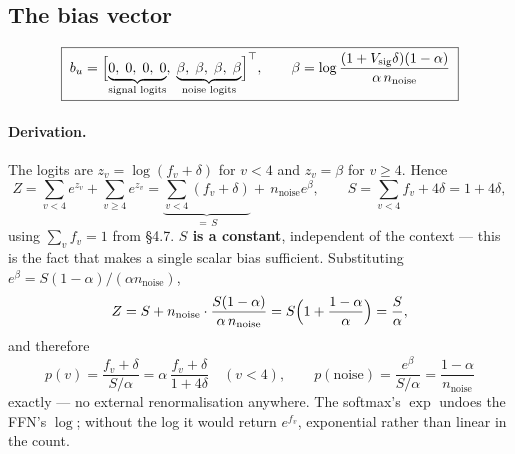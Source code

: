 \documentclass[11pt]{article}
\begin{document}
\subsection{The bias vector}
\begin{equation}
\boxed{\;
b_u=\Bigl[\underbrace{0,\;0,\;0,\;0}_{\text{signal logits}},\;
\underbrace{\beta,\;\beta,\;\beta,\;\beta}_{\text{noise logits}}\Bigr]^\top,
\qquad
\beta=\log\frac{(1+V_{\mathrm{sig}}\delta)(1-\alpha)}{\alpha\,n_{\mathrm{noise}}}\; }
\end{equation}

\paragraph{Derivation.} The logits are $z_v=\log(f_v+\delta)$ for $v<4$ and $z_v=\beta$ for
$v\ge4$. Hence
\begin{equation}
Z=\sum_{v<4}e^{z_v}+\sum_{v\ge4}e^{z_v}=\underbrace{\sum_{v<4}(f_v+\delta)}_{=\,S}
+\,n_{\mathrm{noise}}e^{\beta},
\qquad S=\sum_{v<4}f_v+4\delta=1+4\delta ,
\end{equation}
using $\sum_v f_v=1$ from \S4.7. \textbf{$S$ is a constant}, independent of the context --- this is
the fact that makes a single scalar bias sufficient. Substituting
$e^{\beta}=S(1-\alpha)/(\alpha n_{\mathrm{noise}})$,
\begin{equation}
Z=S+n_{\mathrm{noise}}\cdot\frac{S(1-\alpha)}{\alpha\,n_{\mathrm{noise}}}
=S\Bigl(1+\frac{1-\alpha}{\alpha}\Bigr)=\frac{S}{\alpha},
\end{equation}
and therefore
\begin{equation}
\boxed{\;p(v)=\frac{f_v+\delta}{S/\alpha}=\alpha\,\frac{f_v+\delta}{1+4\delta}\quad(v<4),
\qquad
p(\text{noise})=\frac{e^{\beta}}{S/\alpha}=\frac{1-\alpha}{n_{\mathrm{noise}}}\;}
\end{equation}
exactly --- no external renormalisation anywhere. The softmax's $\exp$ undoes the FFN's $\log$;
without the log it would return $e^{f_v}$, exponential rather than linear in the count.
\end{document}
